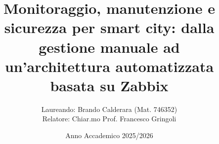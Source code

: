 \documentclass[aspectratio=169]{beamer}
\title{Monitoraggio, manutenzione e
sicurezza per smart city: dalla gestione
manuale ad un’architettura
automatizzata basata su Zabbix}
\author[Brando Calderara]{
    Laureando: Brando Calderara (Mat. 746352) \\
    \vspace{0.3cm}
    Relatore: Chiar.mo Prof. Francesco Gringoli
}
\date{Anno Accademico 2025/2026}
\institute[UniBs]{
    Ingegneria delle Tecnologie per l'Impresa Digitale
}
\begin{document}
\begin{frame}
    \thispagestyle{empty}
    \titlepage
\end{frame}
\end{document}

